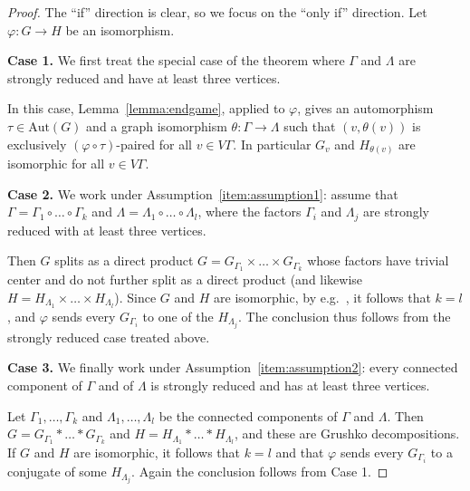 \documentclass[a4paper,english,11pt]{article}
\theoremstyle{definition}
\theoremstyle{remark}
\newcommand{\Aut}{\mathrm{Aut}}
\begin{document}
\begin{proof}
The “if” direction is clear, so we focus on the “only if” direction. Let $\varphi:G\to H$ be an isomorphism.

\medskip

\textbf{Case 1.} We first treat the special case of the theorem where $\Gamma$ and $\Lambda$ are strongly reduced and have at least three vertices. 

 In this case, Lemma~\ref{lemma:endgame}, applied to $\varphi$, gives an automorphism $\tau\in \Aut(G)$ and a graph isomorphism $\theta:\Gamma\rightarrow \Lambda$ such that $(v,\theta(v))$ is exclusively $(\varphi\circ\tau)$-paired for all $v\in V\Gamma$. In particular $G_v$ and $H_{\theta(v)}$ are isomorphic for all $v\in V\Gamma$.

\medskip 

\textbf{Case 2.} We work under Assumption~\ref{item:assumption1}:
assume that $\Gamma=\Gamma_1\circ\dots\circ\Gamma_k$ and $\Lambda=\Lambda_1\circ\dots\circ\Lambda_l$, where the factors $\Gamma_i$ and $\Lambda_j$ are strongly reduced with at least three vertices.

Then $G$ splits as a direct product $G=G_{\Gamma_1}\times\dots\times G_{\Gamma_k}$ whose factors have trivial center \cite[Theorem~3.34]{Gre} and do not further split as a direct product \cite[Proposition~2.8]{Gen} (and likewise $H=H_{\Lambda_1}\times\dots\times H_{\Lambda_l}$). Since $G$ and $H$ are isomorphic, by e.g.\ \cite[Lemma~3.5]{Fio}, it follows that $k=l$, and $\varphi$ sends every $G_{\Gamma_i}$ to one of the $H_{\Lambda_j}$. The conclusion thus follows from the strongly reduced case treated above. 

\medskip 

\textbf{Case 3.} We finally work under Assumption~\ref{item:assumption2}: every connected component of $\Gamma$ and of $\Lambda$ is strongly reduced and has at least three vertices.

Let $\Gamma_1,\dots,\Gamma_k$ and $\Lambda_1,\dots,\Lambda_l$ be the connected components of $\Gamma$ and $\Lambda$. Then $G=G_{\Gamma_1}\ast\dots\ast G_{\Gamma_k}$ and $H=H_{\Lambda_1}\ast\dots\ast H_{\Lambda_l}$, and these are Grushko decompositions. If $G$ and $H$ are isomorphic, it follows that $k=l$ and that $\varphi$ sends every $G_{\Gamma_i}$ to a conjugate of some $H_{\Lambda_j}$. Again the conclusion follows from Case 1.
\end{proof}



\end{document}
